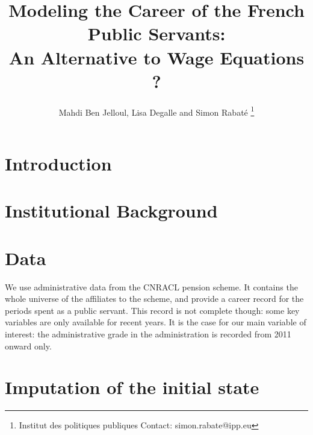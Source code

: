 \documentclass[11pt,a4paper]{article}
\begin{document}
\title{Modeling the Career of the French Public Servants: \\ An Alternative to Wage Equations ?}


\author{Mahdi Ben Jelloul, Lisa Degalle and Simon Rabat\'e \thanks{Institut des politiques publiques \newline Contact: simon.rabate@ipp.eu}}


\maketitle

\section{Introduction}



\section{Institutional Background}


\section{Data}

We use administrative data from the CNRACL pension scheme. It contains the whole universe of the affiliates to the scheme, and provide a career record for the periods spent as a public servant. This record is not complete though: some key variables are only available for recent years. It is the case for our main variable of interest: the administrative grade in the administration is recorded from 2011 onward only. 


\appendix

\section{Imputation of the initial state}
\end{document}
